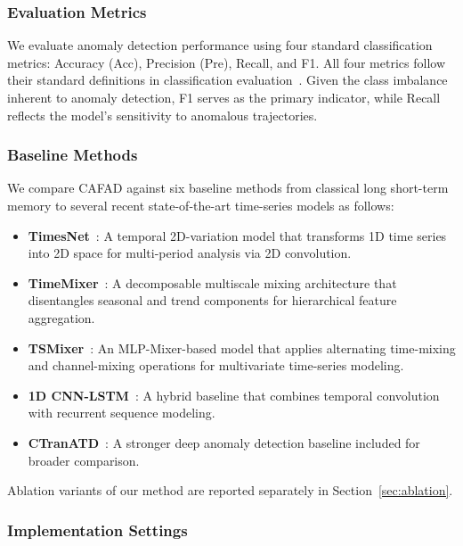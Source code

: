 \documentclass[iicol,pdflatex,sn-basic,Numbered]{sn-jnl}%
\theoremstyle{thmstyleone}%
\theoremstyle{thmstyletwo}%
\theoremstyle{thmstylethree}%
\begin{document}
\subsubsection{Evaluation Metrics}
\label{sec:metrics}

We evaluate anomaly detection performance using four standard classification metrics: Accuracy (Acc), Precision (Pre), Recall, and F1.
All four metrics follow their standard definitions in classification evaluation~\cite{powers2020evaluation}.
Given the class imbalance inherent to anomaly detection, F1 serves as the primary indicator, while Recall reflects the model's sensitivity to anomalous trajectories.


\subsubsection{Baseline Methods}

We compare CAFAD against six baseline methods from classical long short-term memory to several recent state-of-the-art time-series models as follows:
\begin{itemize}
\item \textbf{TimesNet}~\cite{wu2023timesnet}: A temporal 2D-variation model that transforms 1D time series into 2D space for multi-period analysis via 2D convolution.
\item \textbf{TimeMixer}~\cite{wang2024timemixer}: A decomposable multiscale mixing architecture that disentangles seasonal and trend components for hierarchical feature aggregation.
\item \textbf{TSMixer}~\cite{chen2023tsmixer}: An MLP-Mixer-based model that applies alternating time-mixing and channel-mixing operations for multivariate time-series modeling.
\item \textbf{1D CNN-LSTM}~\cite{yang2024data}: A hybrid baseline that combines temporal convolution with recurrent sequence modeling.
\item \textbf{CTranATD}~\cite{Han2025CNNTransformerBA}: A stronger deep anomaly detection baseline included for broader comparison.
\end{itemize}
Ablation variants of our method are reported separately in Section~\ref{sec:ablation}.

\subsubsection{Implementation Settings}
\end{document}
